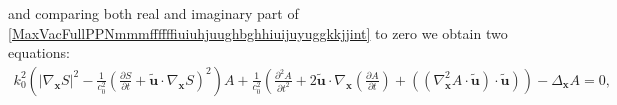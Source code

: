 \documentclass{article}
\theoremstyle{definition}
\theoremstyle{remark}
\renewcommand{\vec}[1]{\mathbf{#1}}
\newcommand{\er}{\eqref}
\newcommand{\er}{\eqref}
\begin{document}
\begin{comment}
Then:
\begin{multline}\label{MaxVacFullPPNmmmffffffiuiuhjuughbghhiuijghghghjjint}
-\frac{k^2_0}{c^2_0}\left(\frac{\partial S}{\partial
t}\right)^2A+\frac{ik_0}{c^2_0}\left(\frac{\partial^2 S}{\partial
t^2}\right)A+\frac{2ik_0}{c^2_0}\frac{\partial A}{\partial
t}\frac{\partial S}{\partial t}+\frac{1}{c^2_0}\frac{\partial^2
A}{\partial t^2}-\frac{2k^2_0}{c^2_0}\frac{\partial S}{\partial
t}\left(\vec {\tilde u}\cdot\nabla_{\vec x}S\right)A\\+\frac{2ik_0
}{c^2_0}\left(\vec {\tilde u}\cdot \nabla_{\vec
x}\left(\frac{\partial S}{\partial
t}\right)\right)A+\frac{2ik_0}{c^2_0}\left(\vec {\tilde
u}\cdot\nabla_{\vec x}A\right)\frac{\partial S}{\partial
t}+\frac{2ik_0}{c^2_0}\left(\vec {\tilde u}\cdot\nabla_{\vec
x}S\right)\frac{\partial A}{\partial t}+\frac{2}{c^2_0}\vec {\tilde
u}\cdot\nabla_{\vec x}\left(\frac{\partial A}{\partial
t}\right)\\-\frac{k^2_0}{c^2}\left|\vec {\tilde u}\cdot\nabla_{\vec
x}S\right|^2A+\frac{ik_0}{c^2_0}\left(\left(\nabla^2_{\vec
x}S\cdot\vec {\tilde u}\right)\cdot\vec {\tilde
u}\right)A+\frac{2ik_0}{c^2_0}\left(\vec {\tilde u}\cdot\nabla_{\vec
x}A\right)\left(\vec {\tilde u}\cdot\nabla_{\vec
x}S\right)+\frac{1}{c^2_0}\left(\left(\nabla^2_{\vec x}A\cdot\vec
{\tilde u}\right)\cdot\vec {\tilde
u}\right)\\+k^2_0\left|\nabla_{\vec
x}S\right|^2A-ik_0\left(\Delta_{\vec
x}S\right)A-2ik_0\left(\nabla_{\vec x}A\cdot\nabla_{\vec
x}S\right)-\left(\Delta_{\vec x}A\right)=0.
\end{multline}
\end{comment}
%
%
%
and comparing both real and imaginary part of
\er{MaxVacFullPPNmmmffffffiuiuhjuughbghhiuijuyuggkkjjint} to zero we
obtain two equations:
\begin{multline}\label{MaxVacFullPPNmmmffffffiuiuhjuughbghhiuijghghghhjhjhjjint}
k^2_0\left(\left|\nabla_{\vec
x}S\right|^2-\frac{1}{c^2_0}\left(\frac{\partial S}{\partial t}+\vec
{\tilde u}\cdot\nabla_\vec x
S\right)^2\right)A+\frac{1}{c^2_0}\left(\frac{\partial^2 A}{\partial
t^2}+2\vec {\tilde u}\cdot\nabla_{\vec x}\left(\frac{\partial
A}{\partial t}\right)+\left(\left(\nabla^2_{\vec x}A\cdot\vec
{\tilde u}\right)\cdot\vec {\tilde u}\right)\right)-\Delta_{\vec
x}A=0,
%
%
%
\end{multline}
\end{document}

